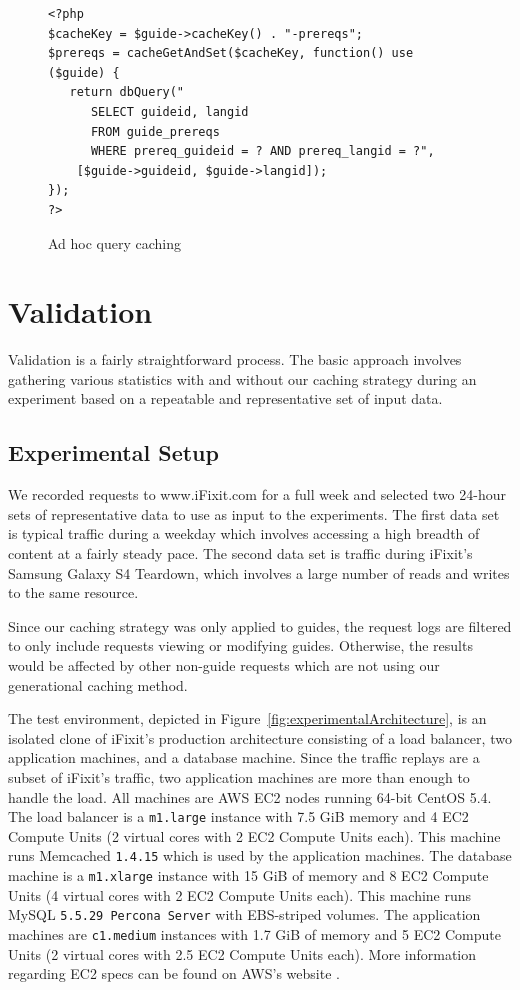 \documentclass[12pt]{ucthesis}
\begin{document}
\begin{figure}[h]
\begin{ssp}
\begin{verbatim}
<?php
$cacheKey = $guide->cacheKey() . "-prereqs";
$prereqs = cacheGetAndSet($cacheKey, function() use ($guide) {
   return dbQuery("
      SELECT guideid, langid
      FROM guide_prereqs
      WHERE prereq_guideid = ? AND prereq_langid = ?",
    [$guide->guideid, $guide->langid]);
});
?>
\end{verbatim}
\end{ssp}
\caption{Ad hoc query caching}
\label{fig:adHocQueryCaching}
\end{figure}


\chapter{Validation} \label{validation}
Validation is a fairly straightforward process.
The basic approach involves gathering various statistics with and without our caching strategy during an experiment based on a repeatable and representative set of input data.

\section{Experimental Setup}
We recorded requests to \textsf{www.iFixit.com} for a full week and selected two 24-hour sets of representative data to use as input to the experiments.
The first data set is typical traffic during a weekday which involves accessing a high breadth of content at a fairly steady pace.
The second data set is traffic during \textsf{iFixit}'s Samsung Galaxy S4 Teardown\cite{ifixitGalaxyS4Teardown}, which involves a large number of reads and writes to the same resource.

Since our caching strategy was only applied to guides, the request logs are filtered to only include requests viewing or modifying guides.
Otherwise, the results would be affected by other non-guide requests which are not using our generational caching method.

The test environment, depicted in Figure~\ref{fig:experimentalArchitecture}, is an isolated clone of \textsf{iFixit}'s production architecture consisting of a load balancer, two application machines, and a database machine.
Since the traffic replays are a subset of \textsf{iFixit}'s traffic, two application machines are more than enough to handle the load.
All machines are AWS EC2 nodes running 64-bit CentOS 5.4.
The load balancer is a {\tt m1.large} instance with 7.5 GiB memory and 4 EC2 Compute Units (2 virtual cores with 2 EC2 Compute Units each).
This machine runs \textsf{Memcached} {\tt 1.4.15} which is used by the application machines.
The database machine is a {\tt m1.xlarge} instance with 15 GiB of memory and 8 EC2 Compute Units (4 virtual cores with 2 EC2 Compute Units each).
This machine runs \textsf{MySQL} {\tt 5.5.29 Percona Server} with EBS-striped volumes.
The application machines are {\tt c1.medium} instances with 1.7 GiB of memory and 5 EC2 Compute Units (2 virtual cores with 2.5 EC2 Compute Units each).
More information regarding EC2 specs can be found on AWS's website \cite{awsInstanceTypes}.
\end{document}
